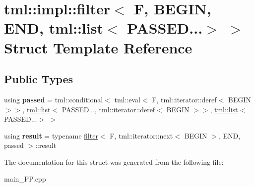 \hypertarget{structtml_1_1impl_1_1filter_3_01F_00_01BEGIN_00_01END_00_01tml_1_1list_3_01PASSED_8_8_8_4_01_4}{\section{tml\+:\+:impl\+:\+:filter$<$ F, B\+E\+G\+I\+N, E\+N\+D, tml\+:\+:list$<$ P\+A\+S\+S\+E\+D...$>$ $>$ Struct Template Reference}
\label{structtml_1_1impl_1_1filter_3_01F_00_01BEGIN_00_01END_00_01tml_1_1list_3_01PASSED_8_8_8_4_01_4}
}
\subsection*{Public Types}
\begin{DoxyCompactItemize}
\item 
\hypertarget{structtml_1_1impl_1_1filter_3_01F_00_01BEGIN_00_01END_00_01tml_1_1list_3_01PASSED_8_8_8_4_01_4_a0ca61795de3cb1266445f949ffcc5a41}{using {\bfseries passed} = tml\+::conditional$<$ tml\+::eval$<$ F, tml\+::iterator\+::deref$<$ B\+E\+G\+I\+N $>$$>$, \hyperlink{structtml_1_1list}{tml\+::list}$<$ P\+A\+S\+S\+E\+D..., tml\+::iterator\+::deref$<$ B\+E\+G\+I\+N $>$$>$, \hyperlink{structtml_1_1list}{tml\+::list}$<$ P\+A\+S\+S\+E\+D...$>$ $>$}\label{structtml_1_1impl_1_1filter_3_01F_00_01BEGIN_00_01END_00_01tml_1_1list_3_01PASSED_8_8_8_4_01_4_a0ca61795de3cb1266445f949ffcc5a41}

\item 
\hypertarget{structtml_1_1impl_1_1filter_3_01F_00_01BEGIN_00_01END_00_01tml_1_1list_3_01PASSED_8_8_8_4_01_4_a33346af07e8d31f3aeec3b4c80288d41}{using {\bfseries result} = typename \hyperlink{structtml_1_1impl_1_1filter}{filter}$<$ F, tml\+::iterator\+::next$<$ B\+E\+G\+I\+N $>$, E\+N\+D, passed $>$\+::result}\label{structtml_1_1impl_1_1filter_3_01F_00_01BEGIN_00_01END_00_01tml_1_1list_3_01PASSED_8_8_8_4_01_4_a33346af07e8d31f3aeec3b4c80288d41}

\end{DoxyCompactItemize}


The documentation for this struct was generated from the following file\+:\begin{DoxyCompactItemize}
\item 
main\+\_\+\+P\+P.\+cpp\end{DoxyCompactItemize}
